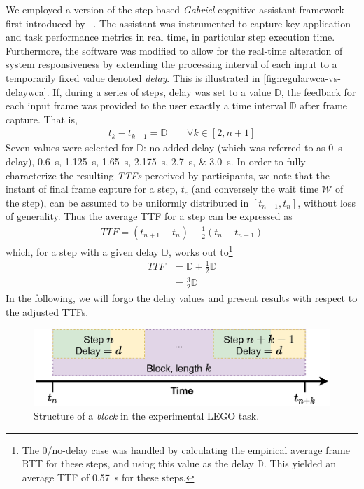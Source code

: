 We employed a version of the step-based \emph{Gabriel} cognitive assistant framework first introduced by \citeauthor{chen2018application}~\cite{chen2018application}.
The assistant was instrumented to capture key application and task performance metrics in real time, in particular step execution time.
Furthermore, the software was modified to allow for the real-time alteration of system responsiveness by extending the processing interval of each input to a temporarily fixed value denoted \emph{delay}.
This is illustrated in \cref{fig:regularwca-vs-delaywca}.
If, during a series of steps, delay was set to a value \ensuremath{\mathbb{D}}, the feedback for each input frame was provided to the user exactly a time interval \ensuremath{\mathbb{D}} after frame capture.
That is,
\begin{align}
    t_k - t_{k - 1} = \mathbb{D} \qquad \forall k \in [2, n + 1]
\end{align}
Seven values were selected for \ensuremath{\mathbb{D}}: no added delay (which was referred to as \SI{0}{\second} delay), \SIlist{0.6;1.125;1.65;2.175;2.7;3.0}{\second}.
In order to fully characterize the resulting \emph{\glspl{TTF}} perceived by participants, we note that the instant of final frame capture for a step, \ensuremath{t_c} (and conversely the wait time \( \mathcal{W} \) of the step), can be assumed to be uniformly distributed in \( [t_{n - 1}, t_n] \), without loss of generality.
Thus the average \gls{TTF} for a step can be expressed as
\begin{align*}
    TTF = (t_{n + 1} - t_{n}) + \frac{1}{2}(t_n - t_{n - 1})
\end{align*}
which, for a step with a given delay \ensuremath{\mathbb{D}}, works out to\footnote{%
    The \num{0}/no-delay case was handled by calculating the empirical average frame \gls{RTT} for these steps, and using this value as the delay \ensuremath{\mathbb{D}}.
    This yielded an average \gls{TTF} of \SI{0.57}{\second} for these steps.
}
\begin{align}
    TTF &= \mathbb{D} + \frac{1}{2}\mathbb{D}\nonumber\\
        &= \frac{3}{2}\mathbb{D}
\end{align}
In the following, we will forgo the delay values and present results with respect to the adjusted \glspl{TTF}.

\begin{figure}[tb]
    \centering
    \includegraphics[width=.6\textwidth]{publications/2021ImpactDelayedResponse/Fig4c}
    \caption{Structure of a \emph{block} in the experimental LEGO task.}\label{fig:stepblock}
\end{figure}

